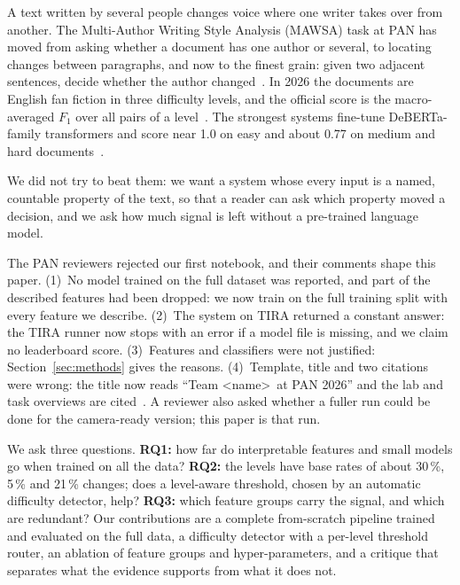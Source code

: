 \documentclass[runningheads]{llncs}
\begin{document}
A text written by several people changes voice where one writer takes over from another. The Multi-Author Writing Style Analysis (MAWSA) task at PAN has moved from asking whether a document has one author or several, to locating changes between paragraphs, and now to the finest grain: given two adjacent sentences, decide whether the author changed~\cite{zangerle2020overview,bevendorff2021overview,zangerle2025overview,zangerle:2026}. In 2026 the documents are English fan fiction in three difficulty levels, and the official score is the macro-averaged $F_1$ over all pairs of a level~\cite{zangerle:2026,bevendorff:2026b}. The strongest systems fine-tune DeBERTa-family transformers and score near 1.0 on easy and about 0.77 on medium and hard documents~\cite{zangerle:2026}.

We did not try to beat them: we want a system whose every input is a named, countable property of the text, so that a reader can ask which property moved a decision, and we ask how much signal is left without a pre-trained language model.

The PAN reviewers rejected our first notebook, and their comments shape this paper. (1)~No model trained on the full dataset was reported, and part of the described features had been dropped: we now train on the full training split with every feature we describe. (2)~The system on TIRA returned a constant answer: the TIRA runner now stops with an error if a model file is missing, and we claim no leaderboard score. (3)~Features and classifiers were not justified: Section~\ref{sec:methods} gives the reasons. (4)~Template, title and two citations were wrong: the title now reads ``Team \textless name\textgreater\ at PAN 2026'' and the lab and task overviews are cited~\cite{bevendorff:2026b,zangerle:2026}. A reviewer also asked whether a fuller run could be done for the camera-ready version; this paper is that run.

We ask three questions. \textbf{RQ1:} how far do interpretable features and small models go when trained on all the data? \textbf{RQ2:} the levels have base rates of about 30\,\%, 5\,\% and 21\,\% changes; does a level-aware threshold, chosen by an automatic difficulty detector, help? \textbf{RQ3:} which feature groups carry the signal, and which are redundant? Our contributions are a complete from-scratch pipeline trained and evaluated on the full data, a difficulty detector with a per-level threshold router, an ablation of feature groups and hyper-parameters, and a critique that separates what the evidence supports from what it does not.
\end{document}
